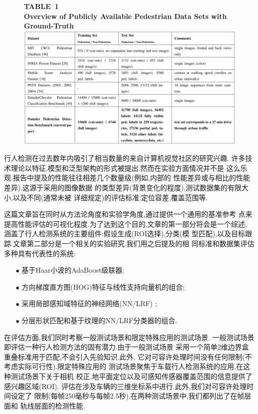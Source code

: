 \documentclass[10pt,letterpaper,journal,compsoc]{IEEEtran}
\begin{document}
\begin{figure}[!t]
\centering
\large{\textbf{TABLE~1\\Overview of Publicly Available Pedestrian Data Sets with Ground-Truth}}
\includegraphics[width=7in]{table1.JPG}
\end{figure}
行人检测在过去数年内吸引了相当数量的来自计算机视觉社区的研究兴趣.
许多技术理论以特征,模型和泛型架构的形式被提出.然而在实验方面情况并不是
这么乐观.报告中提及的性能往往相差几个数量级(例如,\cite{bib74}内部的
性能差异或\cite{bib39}与\cite{bib74}相比的性能差异).这源于采用的图像数据
的类型差异(背景变化的程度),测试数据集的有限大小,以及不同(通常未被
详细规定)的评估标准:定位容差,覆盖范围等.

这篇文章旨在同时从方法论角度和实验学角度,通过提供一个通用的基准参考
点来提高性能评估的可视化程度.为了达到这个目的,文章的第一部分将会是一个综述,
涵盖了行人检测系统的主要组件:假设生成(ROI选择),分类(模
型匹配),以及目标跟踪.文章第二部分是一个相关的实验研究.我们用之后提及的相
同标准和数据集评估多种具有代表性的系统:
\begin{enumerate}
\item[$\bullet$]基于Haar小波的AdaBoost级联器\cite{bib74};
\item[$\bullet$]方向梯度直方图(HOG)特征与线性支持向量机的组合\cite{bib11};
\item[$\bullet$]采用局部感知域特征的神经网络(NN/LRF) \cite{bib75}; 
\item[$\bullet$]分层形状匹配和基于纹理的NN/LRF分类器的组合\cite{bib23}.
\end{enumerate}

在评估方面,我们同时考察一般测试场景和限定特殊应用的测试场景.
一般测试场景即评估一种行人检测方法的固有潜力.由于一般测试场景
采用一个简单2维边界盒重叠标准用于匹配,不会引入先验知识.此外,
它对可容许处理时间没有任何限制(不考虑实际可行性).限定特殊应用的
测试场景聚焦于车载行人检测系统的应用,在这种测试场景下关于相机
校正,地平面定位以及可感知传感器覆盖范围的信息提供了感兴趣区域(ROI).
评估在涉及车辆的三维坐标系中进行.此外,我们对可容许处理时间设定了
限制(每帧250毫秒与每帧2.5秒).在两种测试场景中,我们都列出了在帧层面和
轨线层面的检测性能.
\end{document}
